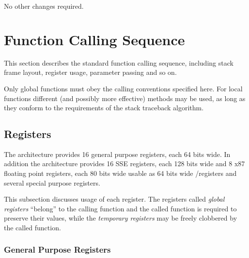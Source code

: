 
No other changes required.

\section{Function Calling Sequence}

This section describes the standard function calling sequence,
including stack frame layout, register usage, parameter passing and so
on.

Only global functions must obey the calling conventions specified
here.  For local functions different (and possibly more effective)
methods may be used, as long as they conform to the requirements of
the stack traceback algorithm.  


\subsection{Registers}
\label{subsec-registers}

The \xARCH architecture provides 16 general purpose registers, each 64
bits wide. In addition the architecture provides 16 SSE registers,
each 128 bits wide and 8 x87 floating point registers, each 80 bits
wide usable as 64 bits wide \MMX/\threednow registers and several special
purpose registers.

This subsection discusses usage of each register.  The registers called
\emph{global registers} ``belong'' to the calling function and the called function
is required to preserve their values, while the \emph{temporary registers} may
be freely clobbered by the called function.

\subsubsection {General Purpose Registers}

